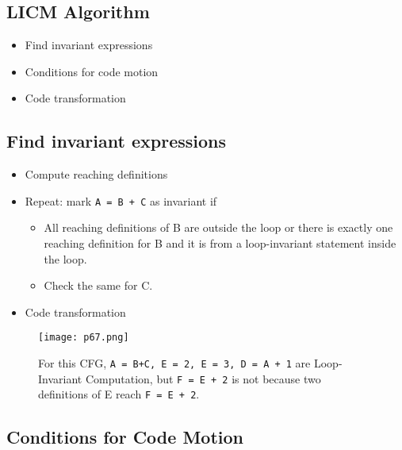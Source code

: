 \subsection{LICM Algorithm}

\begin{itemize}
\item Find invariant expressions
\item Conditions for code motion
\item Code transformation
\end{itemize}



\subsection{Find invariant expressions}


\begin{itemize}
    \item Compute reaching definitions
    \item Repeat: mark \texttt{A = B + C} as invariant if
    \begin{itemize}
        \item All reaching definitions of B are outside the loop or
        there is exactly one reaching definition for B and it is from a loop-invariant statement inside the loop.  
        \item Check the same for C.
        \end{itemize}
    \item Code transformation
    \end{itemize}


    \begin{figure}[H]
        \centering
         \texttt{[image: p67.png]}
             \caption{For this CFG, \texttt{A = B+C, E = 2, E = 3, D = A + 1} are Loop-Invariant Computation, but \texttt{F = E + 2} is not because two definitions of E reach \texttt{F = E + 2}. }
             \label{fig:p67}
    \end{figure}


\subsection{Conditions for Code Motion}




